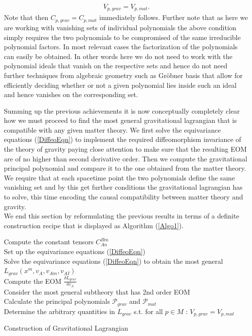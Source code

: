 \documentclass[a4paper,12pt, DIV=14, BCOR=5mm, twoside, headsepline]{scrbook}
\begin{document}
\begin{align}
    V_{p,grav} = V_{p,mat}.
\end{align}
Note that then $C_{p,grav} = C_{p,mat}$ immediately follows. Further note that as  here we are working with vanishing sets of individual polynomials the above condition simply requires the two polynomials to be compromised of the same irreducible polynomial factors. In most relevant cases the factorization of the polynomials can easily be obtained. In other words here we do not need to work with the polynomial ideals that vanish on the respective sets and hence do not need further techniques from algebraic geometry such as Gröbner basis that allow for efficiently deciding whether or not a given polynomial lies inside such an ideal and hence vanishes on the corresponding set.  

Summing up the previous achievements it is now conceptually completely clear how we must proceed to find the most general gravitational lagrangian that is compatible with any given matter theory. We first solve the equivariance equations (\ref{DiffeoEqn}) to implement the required diffeomorphism invariance of the theory of gravity paying close attention to make sure that the resulting EOM are of no higher than second derivative order. Then we compute the gravitational principal polynomial and compare it to the one obtained from the matter theory. We require that at each spacetime point the two polynomials define the same vanishing set and by this get further conditions the gravitational lagrangian has to solve, this time encoding the causal compatibility between matter theory and gravity.\\

We end this section by reformulating the previous results in terms of a definite construction recipe that is displayed as Algorithm (\ref{Algo1}).
\begin{algorithm}[ht]
\SetAlgoLined
{}
Compute the constant tensors $C^{Bm}_{An}$ \\
Set up the equivariance equations (\ref{DiffeoEqn}) \\
Solve the equivariance equations (\ref{DiffeoEqn}) to obtain the most general $L_{grav}(x^m,v_A,v_{Am},v_{AI})$\\
Compute the EOM $\frac{\delta L_{grav}}{\delta v_A}$\\
Consider the most general subtheory that has 2nd order EOM\\
Calculate the principal polynomials $\mathcal{P}_{grav}$ and $\mathcal{P}_{mat}$\\
Determine the arbitrary quantities in $L_{grav}$ s.t. for all $p \in M$ : $V_{p,grav} = V_{p,mat}$
 \caption{Construction of Gravitational Lagrangian}\label{Algo1}
\end{algorithm}
\end{document}
